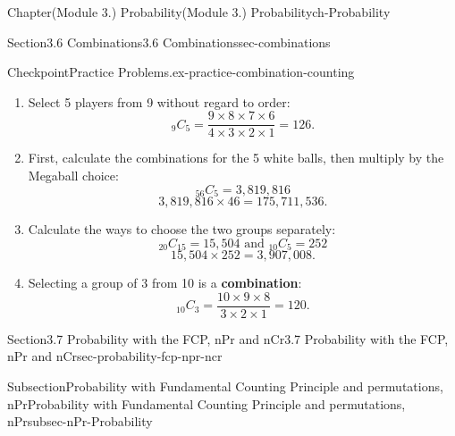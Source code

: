 \documentclass[oneside,10pt,]{book}
\newcommand{\terminology}[1]{\textbf{#1}}
\begin{document}
\begin{chapterptx}{Chapter}{(Module 3.) Probability}{}{(Module 3.) Probability}{}{}{ch-Probability}
\begin{sectionptx}{Section}{3.6 Combinations}{}{3.6 Combinations}{}{}{sec-combinations}
\begin{inlineexercise}{Checkpoint}{Practice Problems.}{ex-practice-combination-counting}
\begin{enumerate}
\begin{equation*}
{}_6 C_3 = \frac{6 \times 5 \times 4}{3 \times 2 \times 1} = 20.
\end{equation*}
%
\item{}Select 5 players from 9 without regard to order:%
\begin{equation*}
{}_9 C_5 = \frac{9 \times 8 \times 7 \times 6}{4 \times 3 \times 2 \times 1} = 126.
\end{equation*}
%
\item{}First, calculate the combinations for the 5 white balls, then multiply by the Megaball choice:%
\begin{equation*}
{}_{56} C_5 = 3{,}819{,}816
\end{equation*}
%
\begin{equation*}
3{,}819{,}816 \times 46 = 175{,}711{,}536.
\end{equation*}
%
\item{}Calculate the ways to choose the two groups separately:%
\begin{equation*}
{}_{20} C_{15} = 15{,}504 \text{ and } {}_{10} C_5 = 252
\end{equation*}
%
\begin{equation*}
15{,}504 \times 252 = 3{,}907{,}008.
\end{equation*}
%
\item{}Selecting a group of 3 from 10 is a \terminology{combination}:%
\begin{equation*}
{}_{10} C_3 = \frac{10 \times 9 \times 8}{3 \times 2 \times 1} = 120.
\end{equation*}
%
\end{enumerate}
%
\end{inlineexercise}%
\end{sectionptx}
%
%
\typeout{************************************************}
\typeout{************************************************}
%
\begin{sectionptx}{Section}{3.7 Probability with the FCP, nPr and nCr}{}{3.7 Probability with the FCP, nPr and nCr}{}{}{sec-probability-fcp-npr-ncr}
%
%
\typeout{************************************************}
\typeout{************************************************}
%
\begin{subsectionptx}{Subsection}{Probability with Fundamental Counting Principle and permutations, nPr}{}{Probability with Fundamental Counting Principle and permutations, nPr}{}{}{subsec-nPr-Probability}

\end{subsectionptx}
\end{sectionptx}
\end{chapterptx}
\end{document}
